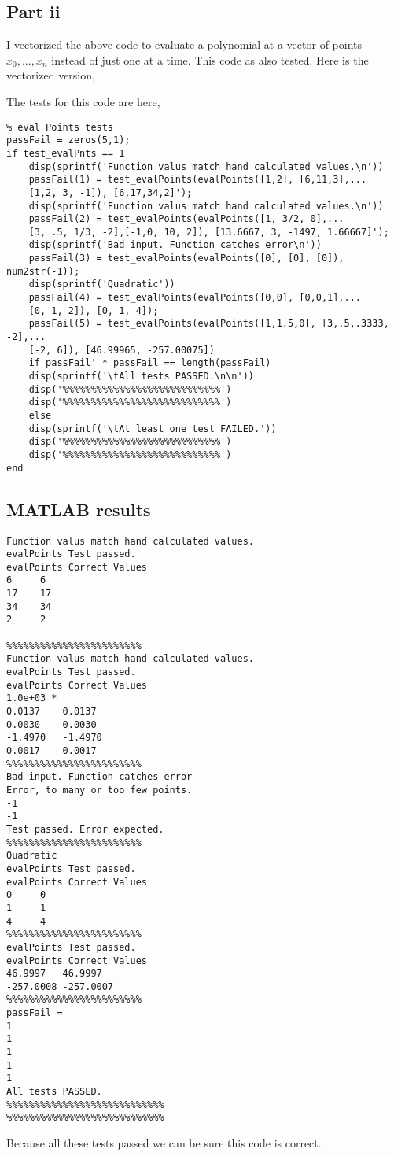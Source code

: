 \documentclass[]{article}
\begin{document}
\subsection*{Part ii} I vectorized the above code to evaluate a polynomial at a vector of points $ x_0, \dots, x_n $ instead of just one at a time. This code as also tested. Here is the vectorized version, 

The tests for this code are here,
\begin{lstlisting}
% eval Points tests
passFail = zeros(5,1);
if test_evalPnts == 1
	disp(sprintf('Function valus match hand calculated values.\n'))
	passFail(1) = test_evalPoints(evalPoints([1,2], [6,11,3],...
	[1,2, 3, -1]), [6,17,34,2]');
	disp(sprintf('Function valus match hand calculated values.\n'))
	passFail(2) = test_evalPoints(evalPoints([1, 3/2, 0],...
	[3, .5, 1/3, -2],[-1,0, 10, 2]), [13.6667, 3, -1497, 1.66667]');
	disp(sprintf('Bad input. Function catches error\n'))
	passFail(3) = test_evalPoints(evalPoints([0], [0], [0]), num2str(-1));
	disp(sprintf('Quadratic'))
	passFail(4) = test_evalPoints(evalPoints([0,0], [0,0,1],...
	[0, 1, 2]), [0, 1, 4]);
	passFail(5) = test_evalPoints(evalPoints([1,1.5,0], [3,.5,.3333, -2],...
	[-2, 6]), [46.99965, -257.00075])
	if passFail' * passFail == length(passFail)
	disp(sprintf('\tAll tests PASSED.\n\n'))
	disp('%%%%%%%%%%%%%%%%%%%%%%%%%%%%')
	disp('%%%%%%%%%%%%%%%%%%%%%%%%%%%%')
	else
	disp(sprintf('\tAt least one test FAILED.'))
	disp('%%%%%%%%%%%%%%%%%%%%%%%%%%%%')
	disp('%%%%%%%%%%%%%%%%%%%%%%%%%%%%')
end

\end{lstlisting}
 \subsection*{MATLAB results}
\begin{verbatim}
Function valus match hand calculated values.
evalPoints Test passed.
evalPoints Correct Values
6     6
17    17
34    34
2     2

%%%%%%%%%%%%%%%%%%%%%%%%
Function valus match hand calculated values.
evalPoints Test passed.
evalPoints Correct Values
1.0e+03 *
0.0137    0.0137
0.0030    0.0030
-1.4970   -1.4970
0.0017    0.0017
%%%%%%%%%%%%%%%%%%%%%%%%
Bad input. Function catches error
Error, to many or too few points.
-1
-1
Test passed. Error expected.
%%%%%%%%%%%%%%%%%%%%%%%%
Quadratic
evalPoints Test passed.
evalPoints Correct Values
0     0
1     1
4     4
%%%%%%%%%%%%%%%%%%%%%%%%
evalPoints Test passed.
evalPoints Correct Values
46.9997   46.9997
-257.0008 -257.0007
%%%%%%%%%%%%%%%%%%%%%%%%
passFail =
1
1
1
1
1
All tests PASSED.
%%%%%%%%%%%%%%%%%%%%%%%%%%%%
%%%%%%%%%%%%%%%%%%%%%%%%%%%%
\end{verbatim}	
	Because all these tests passed we can be sure this code is correct. 	
	
\end{document}
